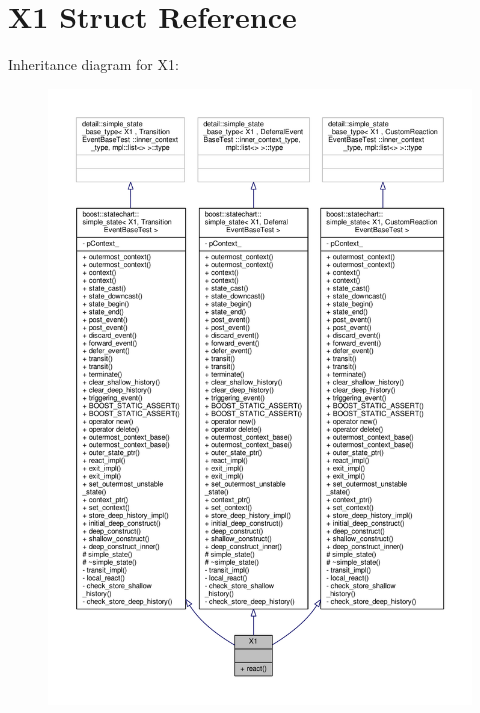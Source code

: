 \hypertarget{struct_x1}{}\section{X1 Struct Reference}
\label{struct_x1}


Inheritance diagram for X1\+:
\nopagebreak
\begin{figure}[H]
\begin{center}
\leavevmode
\includegraphics[width=350pt]{struct_x1__inherit__graph}
\end{center}
\end{figure}


